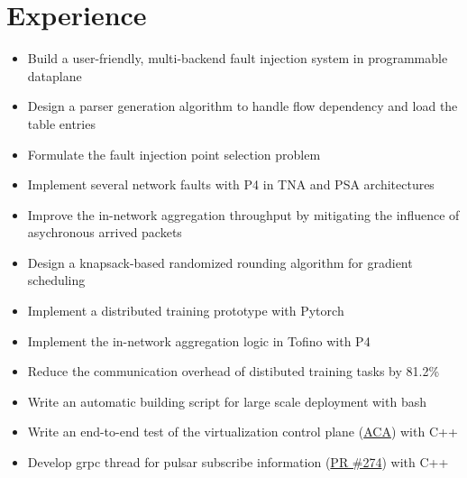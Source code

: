 \documentclass{resume}
\begin{document}
\section{Experience}

\begin{itemize}
  \item Build a user-friendly, multi-backend fault injection system in programmable dataplane
  \item Design a parser generation algorithm to handle flow dependency and load the table entries
  \item Formulate the fault injection point selection problem
  \item Implement several network faults with P4 in TNA and PSA architectures
\end{itemize}

\begin{itemize}
  \item Improve the in-network aggregation throughput by mitigating the influence of asychronous arrived packets
  \item Design a knapsack-based randomized rounding algorithm for gradient scheduling
  \item Implement a distributed training prototype with Pytorch 
  \item Implement the in-network aggregation logic in Tofino with P4
  \item Reduce the communication overhead of distibuted training tasks by 81.2\%
\end{itemize}

\begin{itemize}
  \item Write an automatic building script for large scale deployment with bash
  \item Write an end-to-end test of the virtualization control plane (\href{https://github.com/futurewei-cloud/alcor-control-agent}{ACA}) with C++
  \item Develop grpc thread for pulsar subscribe information (\href{https://github.com/futurewei-cloud/alcor-control-agent/pull/274}{PR \#274}) with C++
\end{itemize}
\end{document}
